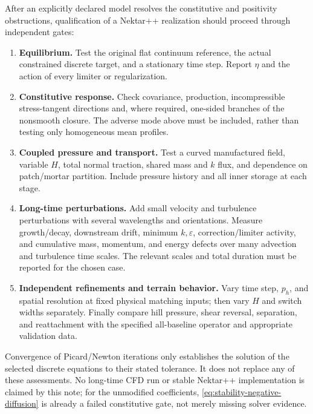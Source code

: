 \documentclass[11pt,a4paper]{article}
\numberwithin{equation}{section}
\newcommand{\eps}{\varepsilon}
\begin{document}
After an explicitly declared model resolves the constitutive and
positivity obstructions, qualification of a Nektar++ realization should
proceed through independent gates:
\begin{enumerate}
\item \textbf{Equilibrium.} Test the original flat continuum reference,
the actual constrained discrete target, and a stationary time step.
Report $\eta$ and the action of every limiter or regularization.
\item \textbf{Constitutive response.} Check covariance, production,
incompressible stress-tangent directions and, where required,
one-sided branches of the nonsmooth closure. The adverse mode above
must be included, rather than testing only homogeneous mean profiles.
\item \textbf{Coupled pressure and transport.} Test a curved manufactured
field, variable $H$, total normal traction, shared mass and $k$ flux,
and dependence on patch/mortar partition. Include pressure history
and all inner storage at each stage.
\item \textbf{Long-time perturbations.} Add small velocity and turbulence
perturbations with several wavelengths and orientations. Measure
growth/decay, downstream drift, minimum $k,\eps$, correction/limiter
activity, and cumulative mass, momentum, and energy defects over many
advection and turbulence time scales. The relevant scales and total
duration must be reported for the chosen case.
\item \textbf{Independent refinements and terrain behavior.} Vary time
step, $p_h$, and spatial resolution at fixed physical matching inputs;
then vary $H$ and switch widths separately. Finally compare hill
pressure, shear reversal, separation, and reattachment with the
specified all-baseline operator and appropriate validation data.
\end{enumerate}
Convergence of Picard/Newton iterations only establishes the solution
of the selected discrete equations to their stated tolerance. It
does not replace any of these assessments. No long-time CFD run or
stable Nektar++ implementation is claimed by this note; for the
unmodified coefficients, \cref{eq:stability-negative-diffusion} is
already a failed constitutive gate, not merely missing solver evidence.
\end{document}
